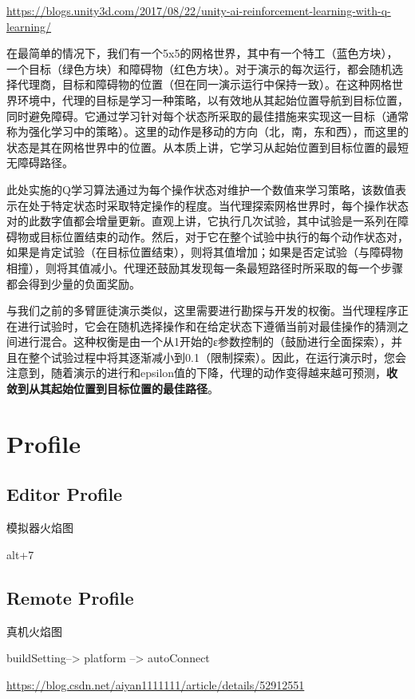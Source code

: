 \documentclass[UTF8,a4paper,12pt]{ctexbook}
\begin{document}
			\url{https://blogs.unity3d.com/2017/08/22/unity-ai-reinforcement-learning-with-q-learning/}

			在最简单的情况下，我们有一个5x5的网格世界，其中有一个特工（蓝色方块），一个目标（绿色方块）和障碍物（红色方块）。对于演示的每次运行，都会随机选择代理商，目标和障碍物的位置（但在同一演示运行中保持一致）。在这种网格世界环境中，代理的目标是学习一种策略，以有效地从其起始位置导航到目标位置，同时避免障碍。它通过学习针对每个状态所采取的最佳措施来实现这一目标（通常称为强化学习中的策略）。这里的动作是移动的方向（北，南，东和西），而这里的状态是其在网格世界中的位置。从本质上讲，它学习从起始位置到目标位置的最短无障碍路径。
			
			此处实施的Q学习算法通过为每个操作状态对维护一个数值来学习策略，该数值表示在处于特定状态时采取特定操作的程度。当代理探索网格世界时，每个操作状态对的此数字值都会增量更新。直观上讲，它执行几次试验，其中试验是一系列在障碍物或目标位置结束的动作。然后，对于它在整个试验中执行的每个动作状态对，如果是肯定试验（在目标位置结束），则将其值增加；如果是否定试验（与障碍物相撞），则将其值减小。代理还鼓励其发现每一条最短路径时所采取的每一个步骤都会得到少量的负面奖励。
			
			与我们之前的多臂匪徒演示类似，这里需要进行勘探与开发的权衡。当代理程序正在进行试验时，它会在随机选择操作和在给定状态下遵循当前对最佳操作的猜测之间进行混合。这种权衡是由一个从1开始的ε参数控制的（鼓励进行全面探索），并且在整个试验过程中将其逐渐减小到0.1（限制探索）。因此，在运行演示时，您会注意到，随着演示的进行和epsilon值的下降，代理的动作变得越来越可预测，\textbf{收敛到从其起始位置到目标位置的最佳路径}。




\chapter{Profile}
	\section{Editor Profile}
		模拟器火焰图
		
		alt+7
		
	\section{Remote Profile}
		真机火焰图
		
		buildSetting--> platform --> autoConnect
		
		\url{https://blog.csdn.net/aiyan1111111/article/details/52912551}
		
\end{document}

